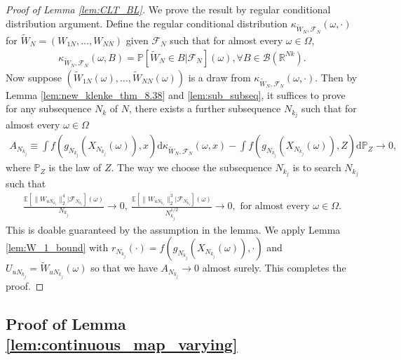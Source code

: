 \documentclass[12pt]{article}
\def\P{\mathbb{P}}
\def\P{\mathbb{P}}
\newcommand{\E}{\mathbb E}								%
\renewcommand{\P}{\mathbb{P}}							%
\begin{document}
\begin{proof}[Proof of Lemma \ref{lem:CLT_BL}]
	We prove the result by regular conditional distribution argument. Define the regular conditional distribution $\kappa_{\tilde W_N,\mathcal{F}_N}(\omega,\cdot)$ for $\tilde W_N=(W_{1N},\ldots,W_{NN})$ given $\mathcal{F}_N$ such that for almost every $\omega\in\Omega$, 
	\begin{align*}
		\kappa_{\tilde{W}_N,\mathcal{F}_N}(\omega,B)=\P[\tilde{W}_N\in B|\mathcal{F}_N](\omega),\forall B\in\mathcal{B}(\mathbb{R}^{Nk}).
	\end{align*}
	Now suppose $(\tilde{W}_{1N}(\omega),\ldots, \tilde{W}_{NN}(\omega))$ is a draw from $\kappa_{\tilde{W}_N,\mathcal{F}_N}(\omega,\cdot)$. Then by Lemma \ref{lem:new_klenke_thm_8.38} and \ref{lem:sub_subseq}, it suffices to prove for any subsequence $N_k$ of $N$, there exists a further subsequence $N_{k_j}$ such that for almost every $\omega\in\Omega$
	\begin{align*}
		A_{N_{k_j}}\equiv \int f\left(g_{N_{k_j}}(X_{N_{k_j}}(\omega)), x\right)\mathrm{d}\kappa_{\tilde{W}_N,\mathcal{F}_N}(\omega,x)-\int f\left(g_{N_{k_j}}(X_{N_{k_j}}(\omega)), Z\right)\mathrm{d}\mathbb{P}_Z\rightarrow 0,
	\end{align*}
	where $\mathbb{P}_Z$ is the law of $Z$. The way we choose the subsequence $N_{k_j}$ is to search $N_{k_j}$ such that
	\begin{align*}
		\frac{\E[\|W_{uN_{k_j}}\|_2^4|\mathcal{F}_{N_{k_j}}](\omega)}{N_{k_j}}\rightarrow 0,\ \frac{\E[\|W_{uN_{k_j}}\|_2^3|\mathcal{F}_{N_{k_j}}](\omega)}{N_{k_j}^{1/2}}\rightarrow 0,\text{ for almost every }\omega\in\Omega.
	\end{align*}
	This is doable guaranteed by the assumption in the lemma. We apply Lemma \ref{lem:W_1_bound} with $r_{N_{k_j}}(\cdot)=f(g_{N_{k_j}}(X_{N_{k_j}}(\omega)),\cdot)$ and $U_{uN_{k_j}}=\tilde{W}_{uN_{k_j}}(\omega)$ so that we have $A_{N_{k_j}}\rightarrow0$ almost surely. This completes the proof. 

\end{proof}

\subsection{Proof of Lemma \ref{lem:continuous_map_varying}}
\end{document}
